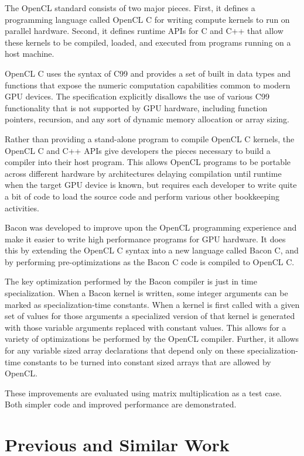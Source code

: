 \documentclass{llncs}
\begin{document}
The OpenCL standard\cite{opencl} consists of two major pieces. First,
it defines a programming language called OpenCL C for writing compute
kernels to run on parallel hardware. Second, it defines runtime APIs
for C and C++ that allow these kernels to be compiled, loaded, and
executed from programs running on a host machine.

OpenCL C uses the syntax of C99 and provides a set of built in data
types and functions that expose the numeric computation capabilities
common to modern GPU devices. The specification explicitly disallows
the use of various C99 functionality that is not supported by GPU
hardware, including function pointers, recursion, and any sort of
dynamic memory allocation or array sizing. 

Rather than providing a stand-alone program to compile OpenCL C
kernels, the OpenCL C and C++ APIs give developers the pieces
necessary to build a compiler into their host program. This allows OpenCL
programs to be portable across different hardware by architectures
delaying compilation until runtime when the target GPU device is
known, but requires each developer to write quite a bit of code to
load the source code and perform various other bookkeeping activities.

Bacon was developed to improve upon the OpenCL programming
experience and make it easier to write high performance programs for
GPU hardware. It does this by extending the OpenCL C syntax into a new
language called Bacon C, and by performing pre-optimizations as
the Bacon C code is compiled to OpenCL C.

The key optimization performed by the Bacon compiler is just in time
specialization. When a Bacon kernel is written, some integer arguments
can be marked as specialization-time constants. When a kernel is first
called with a given set of values for those arguments a specialized
version of that kernel is generated with those variable arguments
replaced with constant values. This allows for a variety of
optimizations be performed by the OpenCL compiler. Further, it allows
for any variable sized array declarations that depend only on these
specialization-time constants to be turned into constant sized arrays
that are allowed by OpenCL.

These improvements are evaluated using matrix multiplication as a test
case. Both simpler code and improved performance are demonstrated.

\section{Previous and Similar Work}
\end{document}
